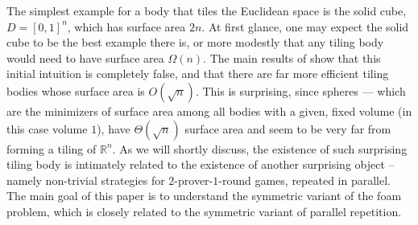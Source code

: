 The simplest example for a body that tiles the Euclidean space is the solid cube, $D = [0,1]^n$, which has surface
area $2n$. At first glance, one may expect the solid cube to be the best example there is, or more modestly
that any tiling body would need to have surface area $\Omega(n)$. The main results of \cite{KROW,AK}
show that this initial intuition is completely false, and that there are far more efficient tiling bodies whose surface area is $O(\sqrt{n})$.
This is surprising, since spheres --- which are the minimizers of surface area among all bodies with a given, fixed volume
(in this case volume $1$), have $\Theta(\sqrt{n})$ surface area and seem to be very far from forming a tiling of $\mathbb{R}^n$.
As we will shortly discuss, the existence of such surprising tiling body is intimately related to the existence of another
surprising object -- namely non-trivial strategies for $2$-prover-$1$-round games, repeated in parallel. The main goal of this
paper is to understand the symmetric variant of the foam problem, which is closely related to the symmetric variant of
parallel repetition.







































































